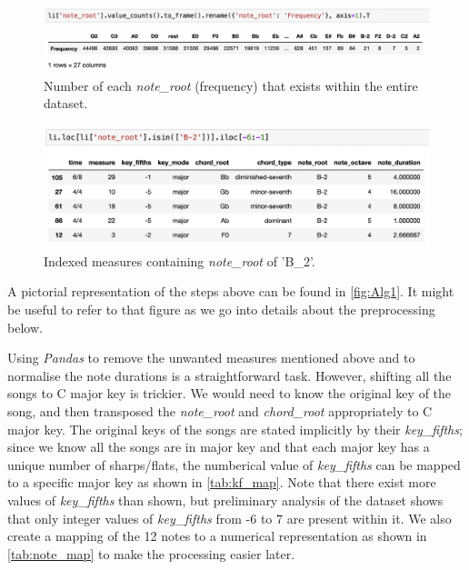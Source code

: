\begin{figure}
    \centering
    \includegraphics[scale=0.5]{Figures/note frequency}
    \decoRule
    \caption{Number of each \emph{note\_root} (frequency) that exists within the entire dataset.}
    \label{fig:notefreq}
    \end{figure}
    
    \begin{figure}
        \centering
        \includegraphics[scale=0.5]{Figures/irregular notes}
        \decoRule
        \caption{Indexed measures containing \emph{note\_root} of 'B\_2'.}
        \label{fig:irregnote}
        \end{figure}
        
A pictorial representation of the steps above can be found in \cref{fig:Alg1}. It might be useful to refer to that figure as we go into details about the preprocessing below.

Using \emph{Pandas} to remove the unwanted measures mentioned above and to normalise the note durations is a straightforward task. However, shifting all the songs to C major key is trickier. We would need to know the original key of the song, and then transposed the \emph{note\_root} and \emph{chord\_root} appropriately to C major key. The original keys of the songs are stated implicitly by their \emph{key\_fifths}; since we know all the songs are in major key and that each major key has a unique number of sharps/flats, the numberical value of \emph{key\_fifths} can be mapped to a specific major key as shown in \cref{tab:kf_map}. Note that there exist more values of \emph{key\_fifths} than shown, but preliminary analysis of the dataset shows that only integer values of \emph{key\_fifths} from -6 to 7 are present within it. We also create a mapping of the 12 notes to a numerical representation as shown in \cref{tab:note_map} to make the processing easier later.

